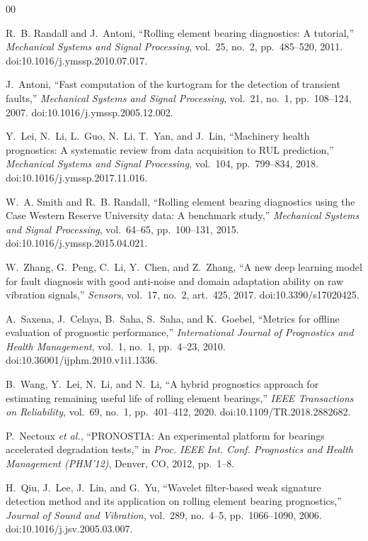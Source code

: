 \documentclass[journal]{IEEEtran}
\begin{document}
\begin{thebibliography}{00}

 R.~B. Randall and J.~Antoni, ``Rolling element bearing diagnostics: A tutorial,''
\emph{Mechanical Systems and Signal Processing}, vol.~25, no.~2, pp.~485--520, 2011.
doi:10.1016/j.ymssp.2010.07.017.

 J.~Antoni, ``Fast computation of the kurtogram for the detection of transient faults,''
\emph{Mechanical Systems and Signal Processing}, vol.~21, no.~1, pp.~108--124, 2007.
doi:10.1016/j.ymssp.2005.12.002.

 Y.~Lei, N.~Li, L.~Guo, N.~Li, T.~Yan, and J.~Lin, ``Machinery health prognostics: A systematic
review from data acquisition to RUL prediction,'' \emph{Mechanical Systems and Signal Processing}, vol.~104,
pp.~799--834, 2018. doi:10.1016/j.ymssp.2017.11.016.

 W.~A. Smith and R.~B. Randall, ``Rolling element bearing diagnostics using the Case Western
Reserve University data: A benchmark study,'' \emph{Mechanical Systems and Signal Processing}, vol.~64--65,
pp.~100--131, 2015. doi:10.1016/j.ymssp.2015.04.021.

 W.~Zhang, G.~Peng, C.~Li, Y.~Chen, and Z.~Zhang, ``A new deep learning model for fault diagnosis
with good anti-noise and domain adaptation ability on raw vibration signals,'' \emph{Sensors}, vol.~17, no.~2,
art.~425, 2017. doi:10.3390/s17020425.

 A.~Saxena, J.~Celaya, B.~Saha, S.~Saha, and K.~Goebel, ``Metrics for offline evaluation of
prognostic performance,'' \emph{International Journal of Prognostics and Health Management}, vol.~1, no.~1,
pp.~4--23, 2010. doi:10.36001/ijphm.2010.v1i1.1336.

 B.~Wang, Y.~Lei, N.~Li, and N.~Li, ``A hybrid prognostics approach for estimating remaining useful
life of rolling element bearings,'' \emph{IEEE Transactions on Reliability}, vol.~69, no.~1, pp.~401--412, 2020.
doi:10.1109/TR.2018.2882682.

 P.~Nectoux \emph{et al.}, ``PRONOSTIA: An experimental platform for bearings accelerated
degradation tests,'' in \emph{Proc. IEEE Int. Conf. Prognostics and Health Management (PHM'12)}, Denver, CO,
2012, pp.~1--8.

 H.~Qiu, J.~Lee, J.~Lin, and G.~Yu, ``Wavelet filter-based weak signature detection method and its
application on rolling element bearing prognostics,'' \emph{Journal of Sound and Vibration}, vol.~289, no.~4--5,
pp.~1066--1090, 2006. doi:10.1016/j.jsv.2005.03.007.

\end{thebibliography}
\end{document}
